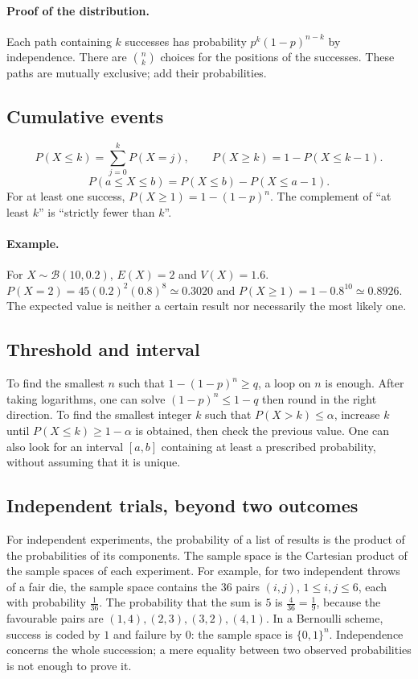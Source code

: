 \paragraph{Proof of the distribution.} Each path containing $k$ successes has probability $p^k(1-p)^{n-k}$ by independence. There are $\binom nk$ choices for the positions of the successes. These paths are mutually exclusive; add their probabilities.
\subsection{Cumulative events}
\[P(X\le k)=\sum_{j=0}^kP(X=j),\qquad P(X\ge k)=1-P(X\le k-1).\]\[P(a\le X\le b)=P(X\le b)-P(X\le a-1).\]
For at least one success, $P(X\ge1)=1-(1-p)^n$. The complement of ``at least $k$'' is ``strictly fewer than $k$''.
\paragraph{Example.} For $X\sim\mathcal B(10,0.2)$, $E(X)=2$ and $V(X)=1.6$. $P(X=2)=45(0.2)^2(0.8)^8\simeq0.3020$ and $P(X\ge1)=1-0.8^{10}\simeq0.8926$. The expected value is neither a certain result nor necessarily the most likely one.
\subsection{Threshold and interval}
To find the smallest $n$ such that $1-(1-p)^n\ge q$, a loop on $n$ is enough. After taking logarithms, one can solve $(1-p)^n\le1-q$ then round in the right direction.
To find the smallest integer $k$ such that $P(X>k)\le\alpha$, increase $k$ until $P(X\le k)\ge1-\alpha$ is obtained, then check the previous value. One can also look for an interval $[a,b]$ containing at least a prescribed probability, without assuming that it is unique.
\subsection{Independent trials, beyond two outcomes}
For independent experiments, the probability of a list of results is the product of the probabilities of its components. The sample space is the Cartesian product of the sample spaces of each experiment. For example, for two independent throws of a fair die, the sample space contains the $36$ pairs $(i,j)$, $1\le i,j\le6$, each with probability $\frac{1}{36}$. The probability that the sum is $5$ is $\frac{4}{36}=\frac{1}{9}$, because the favourable pairs are $(1,4),(2,3),(3,2),(4,1)$.
In a Bernoulli scheme, success is coded by $1$ and failure by $0$: the sample space is $\{0,1\}^n$. Independence concerns the whole succession; a mere equality between two observed probabilities is not enough to prove it.


